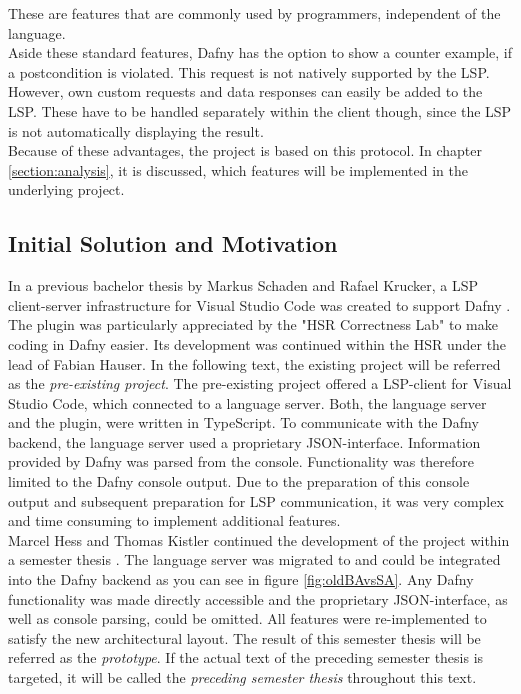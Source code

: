 These are features that are commonly used by programmers, independent of the language.\\

Aside these standard features, Dafny has the option to show a counter example, if a postcondition is violated.
This request is not natively supported by the LSP.
However, own custom requests and data responses can easily be added to the LSP.
These have to be handled separately within the client though, since the LSP is not automatically displaying the result. \\

Because of these advantages, the project is based on this protocol.
In chapter \ref{section:analysis}, it is discussed, which features will be implemented in the underlying project.

\subsection{Initial Solution and Motivation}
\label{section:introduction:initialsolution}
In a previous bachelor thesis by Markus Schaden and Rafael Krucker, a LSP client-server infrastructure for Visual Studio Code was created to support Dafny \cite{ba}.
The plugin was particularly appreciated by the "HSR Correctness Lab" \cite{correctnessLab} to make coding in Dafny easier.
Its development was continued within the HSR under the lead of Fabian Hauser.
In the following text, the existing project will be referred as the \textit{pre-existing project}.
The pre-existing project offered a LSP-client for Visual Studio Code, which connected to a language server.
Both, the language server and the plugin, were written in TypeScript.
To communicate with the Dafny backend, the language server used a proprietary JSON-interface.
Information provided by Dafny was parsed from the console.
Functionality was therefore limited to the Dafny console output.
Due to the preparation of this console output and subsequent preparation for LSP communication,
it was very complex and time consuming to implement additional features. \\

Marcel Hess and Thomas Kistler continued the development of the project within a semester thesis \cite{sa}.
The language server was migrated to \CsharpWithSpace and could be integrated into the Dafny backend
as you can see in figure \ref{fig:oldBAvsSA}.
Any Dafny functionality was made directly accessible and the proprietary JSON-interface, as well as console parsing, could be omitted.
All features were re-implemented to satisfy the new architectural layout.
The result of this semester thesis will be referred as the \textit{prototype}.
If the actual text of the preceding semester thesis is targeted, it will be called the \textit{preceding semester thesis} throughout this text.


